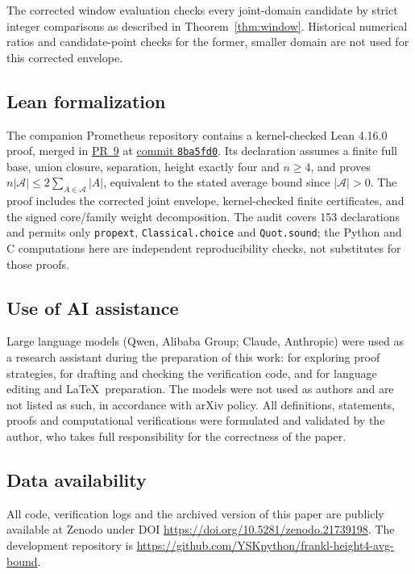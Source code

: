 \documentclass[11pt,a4paper]{amsart}
\theoremstyle{plain}
\theoremstyle{definition}
\newcommand{\A}{\mathcal{A}}
\begin{document}
The corrected window evaluation checks every joint-domain candidate by
strict integer comparisons as described in Theorem~\ref{thm:window}.
Historical numerical ratios and candidate-point checks for the former,
smaller domain are not used for this corrected envelope.

\subsection*{Lean formalization}
The companion Prometheus repository contains a kernel-checked Lean 4.16.0
proof, merged in \href{https://github.com/YSKpython/incognito_lab/pull/9}{PR~9}
at \href{https://github.com/YSKpython/incognito_lab/commit/8ba5fd01228e54e01c2f0001dc2041564f435ce0}{commit \texttt{8ba5fd0}}.
Its declaration  assumes a
finite full base, union closure, separation, height exactly four and $n\ge4$,
and proves $n|\A|\le2\sum_{A\in\A}|A|$, equivalent to the stated average
bound since $|\A|>0$. The proof includes the corrected joint envelope,
kernel-checked finite certificates, and the signed core/family weight
decomposition. The audit covers 153 declarations and permits only
\texttt{propext}, \texttt{Classical.choice} and \texttt{Quot.sound}; the
Python and C computations here are independent reproducibility checks,
not substitutes for those proofs.

\subsection*{Use of AI assistance}
Large language models (Qwen, Alibaba Group; Claude, Anthropic) were used as a
research assistant during the preparation of this work: for exploring proof
strategies, for drafting and checking the verification code, and for language
editing and \LaTeX\ preparation. The models were not used as authors and are not
listed as such, in accordance with arXiv policy. All definitions, statements,
proofs and computational verifications were formulated and validated by the
author, who takes full responsibility for the correctness of the paper.

\subsection*{Data availability}
All code, verification logs and the archived version of this paper are
publicly available at Zenodo under DOI
\url{https://doi.org/10.5281/zenodo.21739198}.
The development repository is
\url{https://github.com/YSKpython/frankl-height4-avg-bound}.
\end{document}

